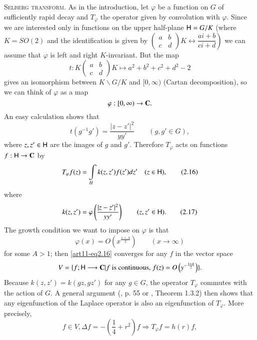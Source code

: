 \medskip
\noindent
\textsc{Selberg transform.} As in the introduction, let $\varphi$ be a function on $G$ of sufficiently rapid decay and $T_\varphi$  the operator given by convolution with $\varphi$. Since we are interested only in functions on the upper half-plane $\mathsf{H} = G / K$ (where $K = SO(2)$ and the identification is given by 
$\left.\left( 
\begin{matrix}
a & b \\
c & d
\end{matrix}
\right) K \leftrightarrow \dfrac{ai + b}{ci + d} \right)$ we can assume that $\varphi$ is left and right $K$-invariant. But the map
$$
t : K \left(\begin{matrix}
a & b \\
 c & d 
\end{matrix}
\right) K \longmapsto a^2 + b^2 + c^2 + d^2 -2
$$
gives an isomorphism between $K \backslash G / K$ and $[0, \infty)$ (Cartan decomposition), so we can think of $\varphi$ as a map
$$
\varphi : [0, \infty) \to  \mathbf{C}. 
$$
An easy calculation shows that 
$$
t (g^{-1} g') = \frac{|z-z'|^2}{yy'} \qquad (g, g' \in G), 
$$
where $z, z' \in \mathsf{H}$ are the images of $g$ and $g'$. Therefore $T_\varphi$  acts on functions $f: \mathsf{H} \to \mathbf{C}$ by
\begin{equation*}
T_\varphi f(z) =\int\limits_{H} k(z, z') f(z') dz' \quad (z \in \mathsf{H}), \tag{2.16} \label{art11-eq2.16}
\end{equation*}\pageoriginale 
where
\begin{equation*}
k(z, z') =\varphi \left(\frac{|z-z'|^2}{yy'} \right) \qquad (z, z' \in \mathsf{H}). \tag{2.17}\label{art11-eq2.17}
\end{equation*}
The growth condition we want to impose on $\varphi$ is that 
\begin{equation*}
\varphi (x) = O \left(x^{\frac{1+A}{2}} \right) \qquad (x \to \infty) \tag{2.18}\label{art11-eq2.18}
\end{equation*}
for some $A >1$; then \eqref{art11-eq2.16} converges for any $f$ in the vector space
$$
V = \{f ;\mathsf{H} \longrightarrow \mathbf{C} |f \text{ is continuous, } f(z) = O \left(y^{-\frac{1+A}{2}} \right)\}. 
$$
Because $k(z,z') =k (gz, gz')$ for any $ g \in G$, the operator $T_\varphi$ commutes with the action of $G$. A general argument (\cf \cite{art11-7}, p. 55 or \cite{art11-4}, Theorem 1.3.2) then shows that any eigenfunction of the Laplace operator is also an eigenfunction of $T_\varphi$. More precisely, 
\begin{equation*}
f\in V, \Delta f= -\left(\frac{1}{4} + r^2 \right) f \Rightarrow T_\varphi f = h (r) f,
\tag{2.19} \label{art11-eq2.19}
\end{equation*}
